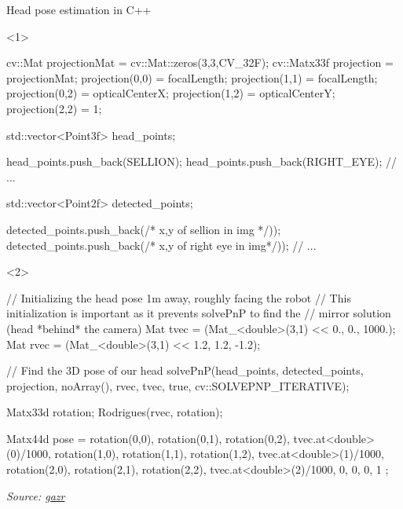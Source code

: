 \documentclass[compress]{beamer}
\newcommand{\source}[2]{{\tiny\it Source: \href{#1}{#2}}}
\begin{document}
\begin{frame}[fragile]{Head pose estimation in C++}

\begin{onlyenv}<1>
\begin{cppcode}

    cv::Mat projectionMat = cv::Mat::zeros(3,3,CV_32F);
    cv::Matx33f projection = projectionMat;
    projection(0,0) = focalLength;
    projection(1,1) = focalLength;
    projection(0,2) = opticalCenterX;
    projection(1,2) = opticalCenterY;
    projection(2,2) = 1;

    std::vector<Point3f> head_points;

    head_points.push_back(SELLION);
    head_points.push_back(RIGHT_EYE);
    // ...

    std::vector<Point2f> detected_points;

    detected_points.push_back(/* x,y of sellion in img */));
    detected_points.push_back(/* x,y of right eye in img*/));
    // ...

\end{cppcode}
\end{onlyenv}
\begin{onlyenv}<2>
\begin{cppcode}
    // Initializing the head pose 1m away, roughly facing the robot
    // This initialization is important as it prevents solvePnP to find the
    // mirror solution (head *behind* the camera)
    Mat tvec = (Mat_<double>(3,1) << 0., 0., 1000.);
    Mat rvec = (Mat_<double>(3,1) << 1.2, 1.2, -1.2);

    // Find the 3D pose of our head
    solvePnP(head_points, detected_points,
            projection, noArray(),
            rvec, tvec, true,
            cv::SOLVEPNP_ITERATIVE);

    Matx33d rotation;
    Rodrigues(rvec, rotation);

    Matx44d pose = {
     rotation(0,0), rotation(0,1), rotation(0,2), tvec.at<double>(0)/1000,
     rotation(1,0), rotation(1,1), rotation(1,2), tvec.at<double>(1)/1000,
     rotation(2,0), rotation(2,1), rotation(2,2), tvec.at<double>(2)/1000,
                 0,             0,             0,                       1
    };

\end{cppcode}
\end{onlyenv}

    \source{http://github.com/severin-lemaignan/gazr}{gazr}
\end{frame}
\end{document}
